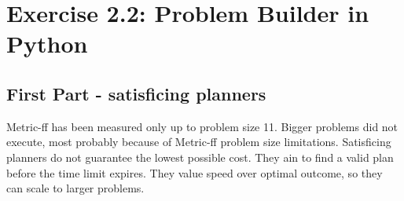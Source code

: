 \documentclass{article}
\begin{document}
\section{Exercise 2.2: Problem Builder in Python}
\subsection{First Part - satisficing planners}

\begin{table}[H]
\centering
{}

Metric-ff has been measured only up to problem size 11. Bigger problems did not execute, most probably because of Metric-ff problem size limitations. 
Satisficing planners do not guarantee the lowest possible cost. They ain to find a  valid plan before the time limit expires. They value speed over optimal outcome, so they can scale to larger problems.
\end{table}
\end{document}
